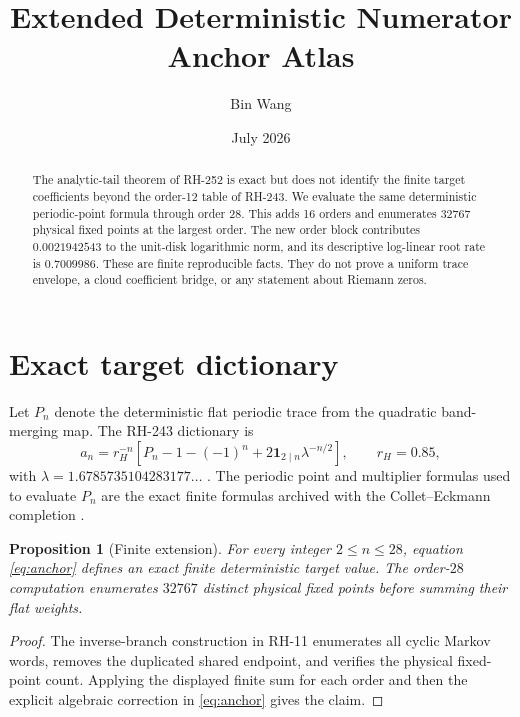 \documentclass[11pt]{article}
\title{Extended Deterministic Numerator Anchor Atlas}
\author{Bin Wang}
\date{July 2026}
\newtheorem{proposition}[theorem]{Proposition}
\theoremstyle{remark}
\begin{document}
\maketitle

\begin{abstract}
The analytic-tail theorem of RH-252 is exact but does not identify the
finite target coefficients beyond the order-12 table of RH-243.  We evaluate
the same deterministic periodic-point formula through order $28$.  This adds
16 orders and enumerates $32767$ physical fixed points at the largest order.
The new order block contributes $0.0021942543$ to the unit-disk logarithmic
norm, and its descriptive log-linear root rate is $0.7009986$.  These are
finite reproducible facts.  They do not prove a uniform trace envelope, a
cloud coefficient bridge, or any statement about Riemann zeros.
\end{abstract}

\section{Exact target dictionary}

Let $P_n$ denote the deterministic flat periodic trace from the quadratic
band-merging map.  The RH-243 dictionary is
\begin{equation}
 a_n=r_H^{-n}\left[P_n-1-(-1)^n+2\mathbf 1_{2\mid n}\lambda^{-n/2}\right],
 \qquad r_H=0.85,
 \label{eq:anchor}
\end{equation}
with $\lambda=1.6785735104283177\ldots$ \citep{WangRH243}.  The periodic
point and multiplier formulas used to evaluate $P_n$ are the exact finite
formulas archived with the Collet--Eckmann completion \citep{WangRH11}.

\begin{proposition}[Finite extension]
\label{prop:finite}
For every integer $2\le n\le28$, equation \eqref{eq:anchor} defines an exact
finite deterministic target value.  The order-$28$ computation enumerates
$32767$ distinct physical fixed points before summing their flat weights.
\end{proposition}

\begin{proof}
The inverse-branch construction in RH-11 enumerates all cyclic Markov words,
removes the duplicated shared endpoint, and verifies the physical fixed-point
count.  Applying the displayed finite sum for each order and then the explicit
algebraic correction in \eqref{eq:anchor} gives the claim.
\end{proof}
\end{document}
